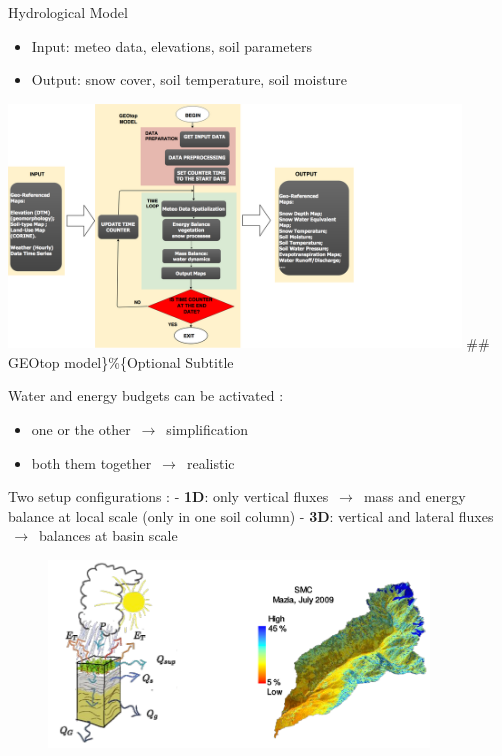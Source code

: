 \documentclass[ignorenonframetext,]{beamer}
\providecommand{\tightlist}{%
  \setlength{\itemsep}{0pt}\setlength{\parskip}{0pt}}
\begin{document}
\begin{frame}{Hydrological Model}

\begin{itemize}
\tightlist
\item
  Input: meteo data, elevations, soil parameters
\item
  Output: snow cover, soil temperature, soil moisture
\end{itemize}

\includegraphics[width=0.90000\textwidth]{resources/images/geotop_revised.png}
\#\# GEOtop model\}\%\{Optional Subtitle

Water and energy budgets can be activated :

\begin{itemize}
\tightlist
\item
  one or the other \(\,\to\,\) simplification
\item
  both them together \(\,\to\,\) realistic
\end{itemize}

Two setup configurations : - \textbf{1D}: only vertical fluxes
\(\,\to\,\) mass and energy balance at local scale (only in one soil
column) - \textbf{3D}: vertical and lateral fluxes \(\,\to\,\) balances
at basin scale

\begin{figure}
\centering
\includegraphics[width=0.90000\textwidth]{resources/images/geotop_ET_SWC.png}
\caption{}
\end{figure}


\end{frame}
\end{document}
